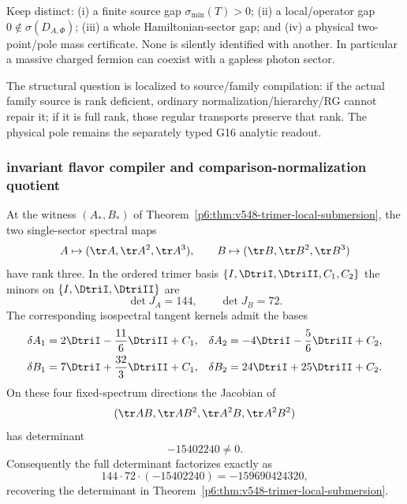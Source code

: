 \documentclass[12pt,a4paper]{article}
\begin{document}
\begin{remark}
\label{p6:rem:v581-gap-taxonomy}
Keep distinct: (i) a finite source gap
$\sigma_{\min}(T)>0$; (ii) a local/operator gap
$0\notin\sigma(D_{A,\Phi})$; (iii) a whole Hamiltonian-sector gap; and
(iv) a physical two-point/pole mass certificate.  None is silently identified
with another.  In particular a massive charged fermion can coexist with a
gapless photon sector.
\end{remark}

\begin{remark}
\label{p6:rem:v581-fermion-frontier}
The structural question is localized to source/family compilation: if the
actual family source is rank deficient, ordinary normalization/hierarchy/RG
cannot repair it; if it is full rank, those regular transports preserve that
rank.  The physical pole remains the separately typed G16 analytic readout.
\end{remark}


\subsubsection*{invariant flavor compiler and comparison-normalization quotient}
\label{p6:sec:v582-invariant-flavor-compiler}

\begin{theorem}
\label{p6:thm:v582-spectral-frame-factorization}
At the witness $(A_*,B_*)$ of
Theorem~\ref{p6:thm:v548-trimer-local-submersion}, the two single-sector
spectral maps
\[
 A\mapsto(\tr A,\tr A^2,\tr A^3),\qquad
 B\mapsto(\tr B,\tr B^2,\tr B^3)
\]
have rank three.  In the ordered trimer basis
$\{I,\DtriI,\DtriII,C_1,C_2\}$ the minors on
$\{I,\DtriI,\DtriII\}$ are
\[
 \boxed{\det J_A=144},\qquad \boxed{\det J_B=72}.
\]
The corresponding isospectral tangent kernels admit the bases
\[
\begin{aligned}
 \delta A_1&=2\DtriI-\frac{11}{6}\DtriII+C_1,&
 \delta A_2&=-4\DtriI-\frac56\DtriII+C_2,\\
 \delta B_1&=7\DtriI+\frac{32}{3}\DtriII+C_1,&
 \delta B_2&=24\DtriI+25\DtriII+C_2.
\end{aligned}
\]
On these four fixed-spectrum directions the Jacobian of
\[
 (\tr AB,\tr AB^2,\tr A^2B,\tr A^2B^2)
\]
has determinant
\[
 \boxed{-15402240\ne0}.
\]
Consequently the full determinant factorizes exactly as
\[
 \boxed{144\cdot72\cdot(-15402240)=-159690424320},
\]
recovering the determinant in
Theorem~\ref{p6:thm:v548-trimer-local-submersion}.
\end{theorem}
\end{document}
